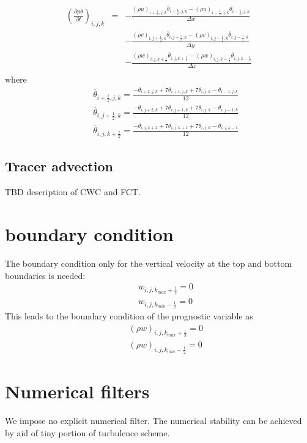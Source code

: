 \begin{eqnarray}
\left(\frac{\partial \rho \theta}{\partial t}\right)_{i,j,k}
&=& - \frac{(\rho u)_{i+\frac{1}{2},j,k} \overline{\theta}_{i+\frac{1}{2},j,k} 
           -(\rho u)_{i-\frac{1}{2},j,k} \overline{\theta}_{i-\frac{1}{2},j,k}}
     {\Delta x}\nonumber\\
& &  - \frac{(\rho v)_{i,j+\frac{1}{2},k} \overline{\theta}_{i,j+\frac{1}{2},k} 
           -(\rho v)_{i,j-\frac{1}{2},k} \overline{\theta}_{i,j-\frac{1}{2},k}}
     {\Delta y}\nonumber\\
& &  - \frac{(\rho w)_{i,j,k+\frac{1}{2}} \overline{\theta}_{i,j,k+\frac{1}{2}} 
           -(\rho w)_{i,j,k-\frac{1}{2}} \overline{\theta}_{i,j,k-\frac{1}{2}}}
     {\Delta z}\nonumber\\
\end{eqnarray}
where
\begin{eqnarray}
&& \overline{\theta}_{i+\frac{1}{2},j,k} = 
\frac{-\theta_{i+2,j,k}+7\theta_{i+1,j,k}+7\theta_{i,j,k}-\theta_{i-1,j,k}}{12}\\
&& \overline{\theta}_{i,j+\frac{1}{2},k} = 
\frac{-\theta_{i,j+2,k}+7\theta_{i,j+1,k}+7\theta_{i,j,k}-\theta_{i,j-1,k}}{12}\\
&& \overline{\theta}_{i,j,k+\frac{1}{2}} = 
\frac{-\theta_{i,j,k+2}+7\theta_{i,j,k+1}+7\theta_{i,j,k}-\theta_{i,j,k-1}}{12}
\end{eqnarray}

\subsection{Tracer advection}
{\Huge TBD}
description of CWC and FCT. 

\section{boundary condition}
The boundary condition only for the vertical velocity at the top and bottom
boundaries is needed:
\begin{eqnarray}
&&  w_{i,j,k_{max}+\frac{1}{2}} = 0\\
&&  w_{i,j,k_{min}-\frac{1}{2}} = 0
\end{eqnarray}
This leads to the boundary condition of the prognostic variable as
\begin{eqnarray}
&&  (\rho w)_{i,j,k_{max}+\frac{1}{2}} = 0\\
&&  (\rho w)_{i,j,k_{min}-\frac{1}{2}} = 0
\end{eqnarray}



\section{Numerical filters}

We impose no explicit numerical filter.
The numerical stability can be achieved
by aid of tiny portion of turbulence scheme.
